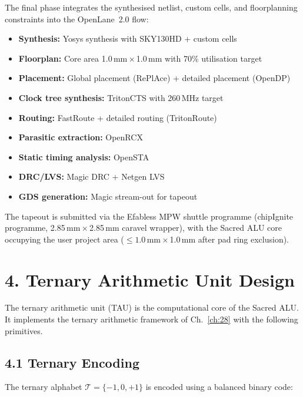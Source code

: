 The final phase integrates the synthesised netlist, custom cells, and
floorplanning constraints into the OpenLane~2.0 flow:

\begin{itemize}
\tightlist
\item \textbf{Synthesis:} Yosys synthesis with SKY130HD + custom cells
\item \textbf{Floorplan:} Core area 1.0\,mm\,\(\times\)\,1.0\,mm with
      70\% utilisation target
\item \textbf{Placement:} Global placement (RePlAce) + detailed
      placement (OpenDP)
\item \textbf{Clock tree synthesis:} TritonCTS with 260\,MHz target
\item \textbf{Routing:} FastRoute + detailed routing (TritonRoute)
\item \textbf{Parasitic extraction:} OpenRCX
\item \textbf{Static timing analysis:} OpenSTA
\item \textbf{DRC/LVS:} Magic DRC + Netgen LVS
\item \textbf{GDS generation:} Magic stream-out for tapeout
\end{itemize}

The tapeout is submitted via the Efabless MPW shuttle programme
(chipIgnite programme, 2.85\,mm\,\(\times\)\,2.85\,mm caravel
wrapper), with the Sacred ALU core occupying the user project area
(\(\leq 1.0\)\,mm\,\(\times\)\,1.0\,mm after pad ring exclusion).

\section{4. Ternary Arithmetic Unit Design}\label{fa_72:ternary-arithmetic-unit}

The ternary arithmetic unit (TAU) is the computational core of the
Sacred ALU. It implements the ternary arithmetic framework of
Ch.~\ref{ch:28} with the following primitives.

\subsection{4.1 Ternary Encoding}

The ternary alphabet \(\mathcal{T} = \{-1, 0, +1\}\) is encoded using
a balanced binary code:

